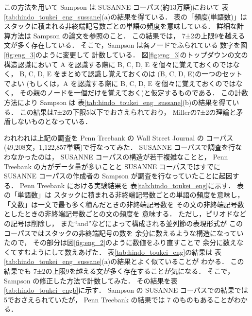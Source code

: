 \begin{figure}[t]
\vspace{-0.5mm}
  \begin{center}
  \end{center}
\end{figure}

この方法を用いて Sampson は SUSANNE コーパス(約13万語)において
表\ref{tab:hindo_toukei_eng_sussane}(a)の結果を得ている．
表の「頻度(単語数)」は
スタックに積まれる非終端記号数ごとの単語の頻度を意味している．
詳細な計算方法は Sampson の論文を参照のこと．
この結果では，
7±2の上限9を越える文が多く存在している．
そこで，Sampson は各ノードでふられている
数字を図\ref{fig:eng_3}のように変更して
計数している．
図\ref{fig:eng_3}のトップダウンの文の構造認識において
A を認識する際に B, C, D, E を個々に覚えておくのではなく，
B, C, D, E をまとめて認識し覚えておくのは
(B, C, D, E)の一つのセットでよい
(もしくは，A を認識する際に B, C, D, E を個々に覚えておくのではなく，
その親のノードを一個だけを覚えておく)と仮定するものである．
この計数方法により Sampson は
表\ref{tab:hindo_toukei_eng_sussane}(b)の結果を得ている．
この結果は7±2の下限5以下でおさえられており，
Millerの7±2の理論と矛盾しないものとなっている．

われわれは上記の調査を
Penn Treebank\cite{Marcus93} の Wall Street Journal の
コーパス(49,208文，1,122,857単語)で行なってみた．
SUSANNE コーパスで調査を行なわなかったのは，
SUSANNE コーパスの構造が若干複雑なことと，
Penn Treebank の方がデータ量が多いことと
SUSANNE コーパスではすでにSUSANNE コーパスの作成者の
Sampson が調査を行なっていたことに起因する．
Penn Treebank における実験結果を
表\ref{tab:hindo_toukei_eng}に示す．
表の「単語数」は
スタックに積まれる非終端記号数ごとの単語の頻度を意味し，
「文数」は一文で最も多く積んだときの非終端記号数を
その文の非終端記号数としたときの非終端記号数ごとの文の頻度を
意味する．
ただし，ピリオドなどの記号は削除し，
また``and''などによって構成される並列節の表現形式が
このコーパスではスタックの非終端記号の数を
余分に数えるような構造になっていたので，
その部分は図\ref{fig:eng_2}のように数値をふり直すことで
余分に数えなくてすむようにして数えあげた．
表\ref{tab:hindo_toukei_eng}の結果は
表\ref{tab:hindo_toukei_eng_sussane}(a)の結果とよく似ていることが
わかる．
この結果でも
7±2の上限9を越える文が多く存在することが気になる．
そこで，Sampson の修正した方法で計数してみた．
その結果を表\ref{tab:hindo_toukei_engb}に示す．
Sampson の SUSANNE コーパスでの結果では5でおさえられていたが，
Penn Treebank の結果では 7 のものもあることがわかる．

